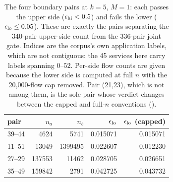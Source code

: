 \begin{table}[!htbp]
\centering
\caption{The four boundary pairs at $k{=}5$, $M{=}1$: each passes the upper side ($\epsilon_{\mathrm{hi}} < 0.5$) and fails the lower ($\epsilon_{\mathrm{lo}} \le 0.05$). These are exactly the pairs separating the 340-pair upper-side count from the 336-pair joint gate. Indices are the corpus's own application labels, which are not contiguous: the 45 services here carry labels spanning $0$--$52$. Per-side flow counts are given because the lower side is computed at full $n$ with the 20{,}000-flow cap removed. Pair (21,23), which is not among them, is the sole pair whose verdict changes between the capped and full-$n$ conventions ().}
\label{tab:boundary}
\begin{tabular}{lrrrr}
\toprule
pair & $n_a$ & $n_b$ & $\epsilon_{\mathrm{lo}}$ & $\epsilon_{\mathrm{lo}}$ (capped) \\
\midrule
39--44 & 4624 & 5741 & 0.015071 & 0.015071 \\
11--51 & 13049 & 1399495 & 0.022607 & 0.012230 \\
27--29 & 137553 & 11462 & 0.028705 & 0.026651 \\
35--49 & 159842 & 2791 & 0.042725 & 0.043732 \\
\bottomrule
\end{tabular}
\end{table}